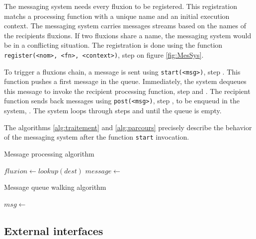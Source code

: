 The messaging system needs every fluxion to be registered.
This registration matchs a processing function with a unique name and an initial execution context.
The messaging system carries messages streams based on the names of the recipients fluxions.
If two fluxions share a name, the messaging system would be in a conflicting situation.
The registration is done using the function \texttt{register(<nom>, <fn>, <context>)}, step  on figure \ref{fig:MesSys}.

To trigger a fluxions chain, a message is sent using \texttt{start(<msg>)}, step .
This function pushes a first message in the queue.
Immediately, the system dequeues this message to invoke the recipient processing function, step  and .
The recipient function sends back messages using \texttt{post(<msg>)}, step , to be enqueud in the system, .
The system loops through steps  and  until the queue is empty.

The algorithms \ref{alg:traitement} and \ref{alg:parcours} precisely describe the behavior of the messaging system after the function \texttt{start} invocation.

\begin{algorithm}
\caption{Message processing algorithm}
\label{alg:traitement}
\begin{algorithmic}
\State $fluxion \gets lookup(dest)$
\State $message \gets$  
\State {} 
\EndFor
\EndFunction
\end{algorithmic}
\end{algorithm}

\begin{algorithm}
\caption{Message queue walking algorithm}
\label{alg:parcours}
\begin{algorithmic}
\State $msg \gets$  
\State {}
\EndWhile
\EndFunction
\end{algorithmic}
\end{algorithm}

\subsection{External interfaces}


